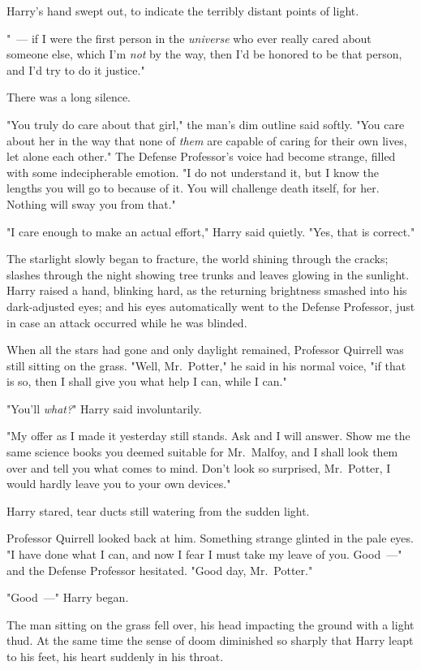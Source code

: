 Harry's hand swept out, to indicate the terribly distant points of light.

"~--- if I were the first person in the \emph{universe} who ever really cared
about someone else, which I'm \emph{not} by the way, then I'd be honored to be
that person, and I'd try to do it justice."

There was a long silence.

"You truly do care about that girl," the man's dim outline said softly. "You
care about her in the way that none of \emph{them} are capable of caring for
their own lives, let alone each other." The Defense Professor's voice had
become strange, filled with some indecipherable emotion. "I do not understand
it, but I know the lengths you will go to because of it. You will challenge
death itself, for her. Nothing will sway you from that."

"I care enough to make an actual effort," Harry said quietly. "Yes, that is
correct."

The starlight slowly began to fracture, the world shining through the cracks;
slashes through the night showing tree trunks and leaves glowing in the
sunlight. Harry raised a hand, blinking hard, as the returning brightness
smashed into his dark-adjusted eyes; and his eyes automatically went to the
Defense Professor, just in case an attack occurred while he was blinded.

When all the stars had gone and only daylight remained, Professor Quirrell was
still sitting on the grass. "Well, Mr.~Potter," he said in his normal voice,
"if that is so, then I shall give you what help I can, while I can."

"You'll \emph{what?}" Harry said involuntarily.

"My offer as I made it yesterday still stands. Ask and I will answer. Show me
the same science books you deemed suitable for Mr.~Malfoy, and I shall look
them over and tell you what comes to mind. Don't look so surprised, Mr.~Potter,
I would hardly leave you to your own devices."

Harry stared, tear ducts still watering from the sudden light.

Professor Quirrell looked back at him. Something strange glinted in the pale
eyes. "I have done what I can, and now I fear I must take my leave of you.
Good~---" and the Defense Professor hesitated. "Good day, Mr.~Potter."

"Good~---" Harry began.

The man sitting on the grass fell over, his head impacting the ground with a
light thud. At the same time the sense of doom diminished so sharply that Harry
leapt to his feet, his heart suddenly in his throat.

